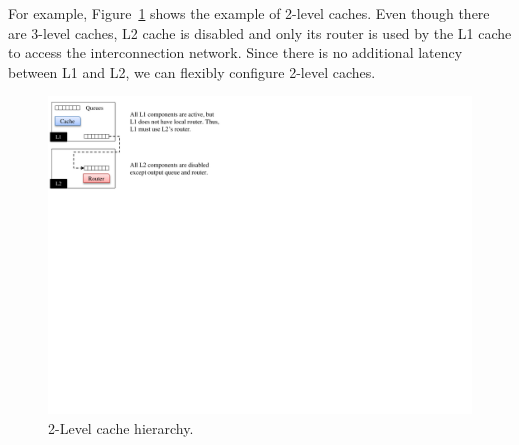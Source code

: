 For example, Figure~\ref{fig:level2cache} shows the example of 2-level
caches. Even though there are 3-level caches, L2 cache is disabled and
only its router is used by the L1 cache to access the interconnection
network. Since there is no additional latency between L1 and L2, we
can flexibly configure 2-level caches.


\begin{figure}[htb]
\centering
\includegraphics{figs/level2cache}
\caption{2-Level cache hierarchy.}
\label{fig:level2cache}
\end{figure}
